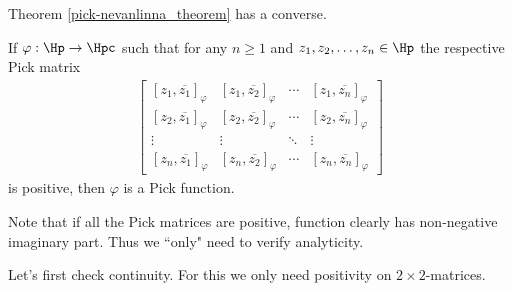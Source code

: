 Theorem \ref{pick-nevanlinna_theorem} has a converse.

\begin{lause}\label{pick-nevanlinna_converse}
	If $\varphi : \Hp \to \Hpc$ such that for any $n \geq 1$ and $z_{1}, z_{2}, \ldots, z_{n} \in \Hp$ the respective Pick matrix
	\begin{align*}
	\begin{bmatrix}
		[z_{1}, \overline{z_{1}}]_{\varphi} & [z_{1}, \overline{z_{2}}]_{\varphi} & \cdots & [z_{1}, \overline{z_{n}}]_{\varphi} \\
		[z_{2}, \overline{z_{1}}]_{\varphi} & [z_{2}, \overline{z_{2}}]_{\varphi} & \cdots & [z_{2}, \overline{z_{n}}]_{\varphi} \\
		\vdots & \vdots & \ddots & \vdots \\
		[z_{n}, \overline{z_{1}}]_{\varphi} & [z_{n}, \overline{z_{2}}]_{\varphi} & \cdots &  [z_{n}, \overline{z_{n}}]_{\varphi}
	\end{bmatrix}
	\end{align*}
	is positive, then $\varphi$ is a Pick function.
\end{lause}

Note that if all the Pick matrices are positive, function clearly has non-negative imaginary part. Thus we ``only" need to verify analyticity.

Let's first check continuity. For this we only need positivity on $2 \times 2$-matrices.

